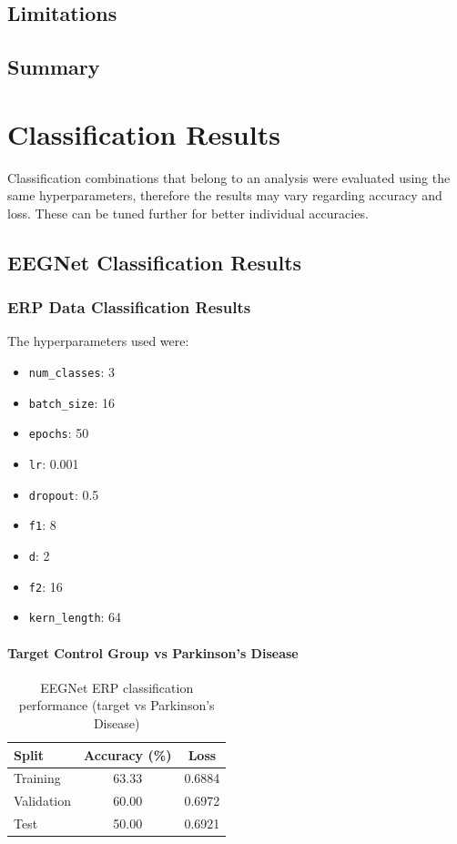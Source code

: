 \documentclass[12pt]{report}
\begin{document}
\section{Limitations}

\section{Summary}

\chapter{Classification Results}

Classification combinations that belong to an analysis were evaluated using the same hyperparameters, therefore the results may vary regarding accuracy and loss. These can be tuned further for better individual accuracies.

\section{EEGNet Classification Results}

\subsection{ERP Data Classification Results}

The hyperparameters used were:

\begin{itemize}
    \item \texttt{num\_classes}: 3
    \item \texttt{batch\_size}: 16
    \item \texttt{epochs}: 50
    \item \texttt{lr}: 0.001
    \item \texttt{dropout}: 0.5
    \item \texttt{f1}: 8
    \item \texttt{d}: 2
    \item \texttt{f2}: 16
    \item \texttt{kern\_length}: 64
\end{itemize}


\subsubsection{Target Control Group vs Parkinson's Disease}

\begin{table}[h]
\centering
\caption{EEGNet ERP classification performance (target vs Parkinson's Disease)}
\begin{tabular}{lcc}
\hline
	\textbf{Split} & \textbf{Accuracy (\%)} & \textbf{Loss} \\
\hline
Training & 63.33 & 0.6884 \\
Validation & 60.00 & 0.6972 \\
Test & 50.00 & 0.6921 \\
\hline
\end{tabular}
\end{table}
\end{document}
